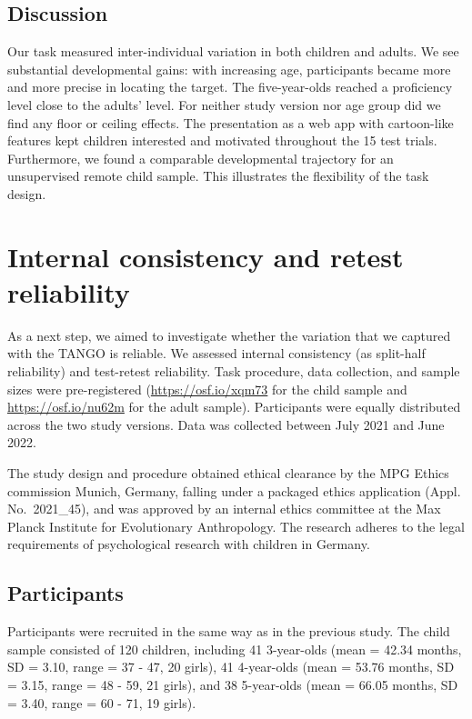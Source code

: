 \documentclass[
  man,floatsintext]{apa6}
\begin{document}
\hypertarget{discussion}{%
\subsection{Discussion}\label{discussion}}

Our task measured inter-individual variation in both children and adults.
We see substantial developmental gains: with increasing age, participants became more and more precise in locating the target.
The five-year-olds reached a proficiency level close to the adults' level.
For neither study version nor age group did we find any floor or ceiling effects.
The presentation as a web app with cartoon-like features kept children interested and motivated throughout the 15 test trials.
Furthermore, we found a comparable developmental trajectory for an unsupervised remote child sample.
This illustrates the flexibility of the task design.

\hypertarget{internal-consistency-and-retest-reliability}{%
\section{Internal consistency and retest reliability}\label{internal-consistency-and-retest-reliability}}

As a next step, we aimed to investigate whether the variation that we captured with the TANGO is reliable.
We assessed internal consistency (as split-half reliability) and test-retest reliability.
Task procedure, data collection, and sample sizes were pre-registered (\url{https://osf.io/xqm73} for the child sample and \url{https://osf.io/nu62m} for the adult sample).
Participants were equally distributed across the two study versions.
Data was collected between July 2021 and June 2022.

The study design and procedure obtained ethical clearance by the MPG Ethics commission Munich, Germany, falling under a packaged ethics application (Appl. No.~2021\_45), and was approved by an internal ethics committee at the Max Planck Institute for Evolutionary Anthropology.
The research adheres to the legal requirements of psychological research with children in Germany.

\hypertarget{participants-1}{%
\subsection{Participants}\label{participants-1}}

Participants were recruited in the same way as in the previous study.
The child sample consisted of 120 children, including 41 3-year-olds (mean = 42.34 months, SD = 3.10, range = 37 - 47, 20 girls), 41 4-year-olds (mean = 53.76 months, SD = 3.15, range = 48 - 59, 21 girls), and 38 5-year-olds (mean = 66.05 months, SD = 3.40, range = 60 - 71, 19 girls).
\end{document}
